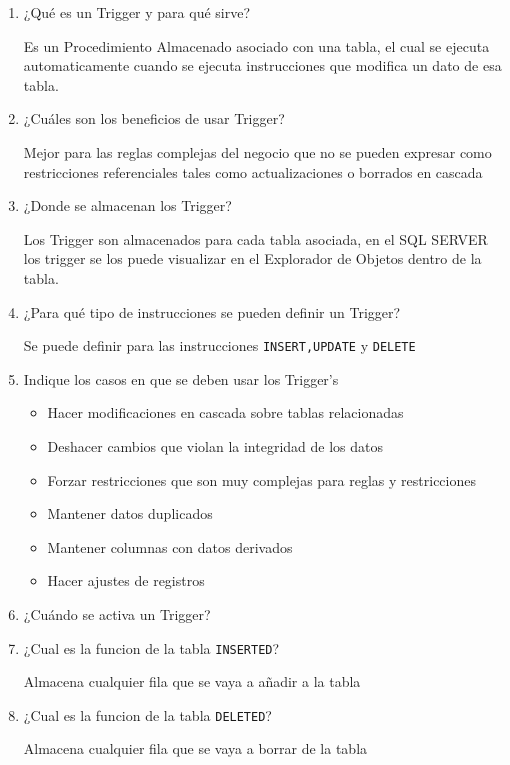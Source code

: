 \begin{enumerate}
\item ¿Qué es un Trigger y para qué sirve?

Es un Procedimiento Almacenado asociado con una tabla, el cual se ejecuta automaticamente cuando se ejecuta instrucciones que modifica un dato de esa tabla.

\item ¿Cuáles son los beneficios de usar Trigger?

Mejor para las reglas complejas del negocio que no se pueden expresar como restricciones referenciales tales como actualizaciones o borrados en cascada

\item ¿Donde se almacenan los Trigger?

Los Trigger son almacenados para cada tabla asociada, en el SQL SERVER los trigger se los puede visualizar en el Explorador de Objetos dentro de la tabla.

\item ¿Para qué tipo de instrucciones se pueden definir un Trigger?

Se puede definir para las instrucciones \texttt{INSERT,UPDATE} y \texttt{DELETE}

\item Indique los casos en que se deben usar  los Trigger's
\begin{itemize}
\item Hacer modificaciones en cascada sobre tablas relacionadas
\item Deshacer cambios que violan la integridad de los datos
\item Forzar restricciones que son muy complejas para reglas y restricciones
\item Mantener datos duplicados
\item Mantener columnas con datos derivados
\item Hacer ajustes de registros
\end{itemize}

\item ¿Cuándo se activa un Trigger?

\item ¿Cual es la funcion de la tabla \texttt{INSERTED}?

Almacena cualquier fila que se vaya a añadir a la tabla

\item ¿Cual es la funcion de la tabla \texttt{DELETED}?

Almacena cualquier fila que se vaya a borrar de la tabla


\end{enumerate}
